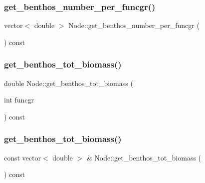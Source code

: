 \mbox{\label{class_node_a156ae52ddc93e4d0a73e819b9052f547}} 
\subsubsection{\texorpdfstring{get\_benthos\_number\_per\_funcgr()}{get\_benthos\_number\_per\_funcgr()}}
{\footnotesize\ttfamily vector$<$ double $>$ Node\+::get\+\_\+benthos\+\_\+number\+\_\+per\+\_\+funcgr (\begin{DoxyParamCaption}{ }\end{DoxyParamCaption}) const}

\mbox{\label{class_node_a7207029294e3d4629e1fe9714896d777}} 
\subsubsection{\texorpdfstring{get\_benthos\_tot\_biomass()}{get\_benthos\_tot\_biomass()}\hspace{0.1cm}{\footnotesize\ttfamily [1/2]}}
{\footnotesize\ttfamily double Node\+::get\+\_\+benthos\+\_\+tot\+\_\+biomass (\begin{DoxyParamCaption}\item[{int}]{funcgr }\end{DoxyParamCaption}) const}

\mbox{\label{class_node_a40537e809585a28325a15e6355933b30}} 
\subsubsection{\texorpdfstring{get\_benthos\_tot\_biomass()}{get\_benthos\_tot\_biomass()}\hspace{0.1cm}{\footnotesize\ttfamily [2/2]}}
{\footnotesize\ttfamily const vector$<$ double $>$ \& Node\+::get\+\_\+benthos\+\_\+tot\+\_\+biomass (\begin{DoxyParamCaption}{ }\end{DoxyParamCaption}) const}

